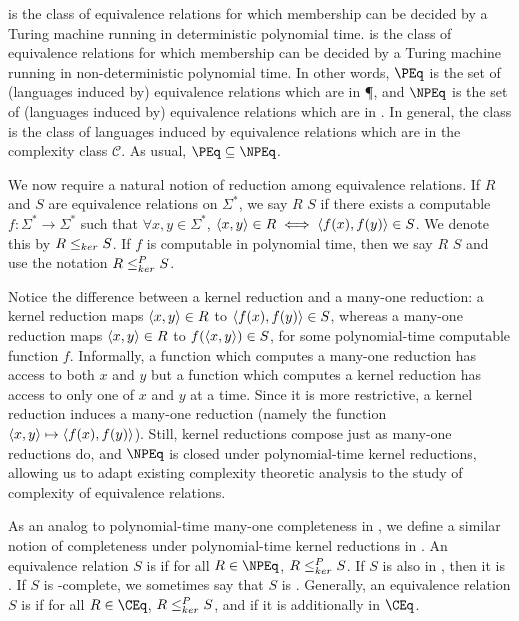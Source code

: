  is the class of equivalence relations for which membership can be decided by a Turing machine running in deterministic polynomial time.
 is the class of equivalence relations for which membership can be decided by a Turing machine running in non-deterministic polynomial time.
In other words, $\PEq$ is the set of (languages induced by) equivalence relations which are in \P, and $\NPEq$ is the set of (languages induced by) equivalence relations which are in \NP.
In general, the class  is the class of languages induced by equivalence relations which are in the complexity class $\mathcal{C}$.
As usual, $\PEq\subseteq\NPEq$.

We now require a natural notion of reduction among equivalence relations.
If $R$ and $S$ are equivalence relations on $\Sigma^*$, we say $R$  $S$ if there exists a computable $f\colon\Sigma^*\to\Sigma^*$ such that $\forall x,y\in\Sigma^*$, $\langle x,y\rangle\in R\iff \langle f(x),f(y)\rangle\in S$.
We denote this by $R\leq_{ker} S$.
If $f$ is computable in polynomial time, then we say $R$  $S$ and use the notation $R\leq^{P}_{ker} S$.

Notice the difference between a kernel reduction and a many-one reduction: a kernel reduction maps $\langle x,y\rangle\in R$ to $\langle f(x),f(y)\rangle\in S$, whereas a many-one reduction maps $\langle x,y\rangle\in R$ to $f(\langle x,y\rangle)\in S$, for some polynomial-time computable function $f$.
Informally, a function which computes a many-one reduction has access to both $x$ and $y$ but a function which computes a kernel reduction has access to only one of $x$ and $y$ at a time.
Since it is more restrictive, a kernel reduction induces a many-one reduction (namely the function $\langle x,y\rangle \mapsto \langle f(x),f(y)\rangle$).
Still, kernel reductions compose just as many-one reductions do, and $\NPEq$ is closed under polynomial-time kernel reductions, allowing us to adapt existing complexity theoretic analysis to the study of complexity of equivalence relations.

As an analog to polynomial-time many-one completeness in \NP, we define a similar notion of completeness under polynomial-time kernel reductions in \NPEq.
An equivalence relation $S$ is  if for all $R\in\NPEq$, $R\leq^{P}_{ker} S$.
If $S$ is also in \NPEq, then it is .
If $S$ is \NPEq-complete, we sometimes say that $S$ is .
Generally, an equivalence relation $S$ is  if for all $R\in\CEq$, $R\leq^{P}_{ker} S$, and  if it is additionally in $\CEq$.
